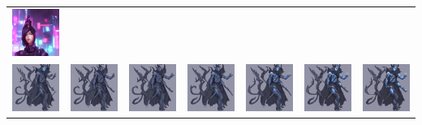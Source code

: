 \begin{table}[!htb]
\begin{tabular}{c c@{}c@{}c@{}c@{}c@{}c}
    \includegraphics[width=0.135\linewidth]{chapter/appendix/def_imgs/cyberpunk/c_60.png} \\
    \includegraphics[width=0.135\linewidth]{chapter/appendix/def_imgs/tiefling/t_0.png} &
    \includegraphics[width=0.135\linewidth]{chapter/appendix/def_imgs/tiefling/t_10.png} &
    \includegraphics[width=0.135\linewidth]{chapter/appendix/def_imgs/tiefling/t_20.png} &
    \includegraphics[width=0.135\linewidth]{chapter/appendix/def_imgs/tiefling/t_30.png} &
    \includegraphics[width=0.135\linewidth]{chapter/appendix/def_imgs/tiefling/t_40.png} &
    \includegraphics[width=0.135\linewidth]{chapter/appendix/def_imgs/tiefling/t_50.png} &
    \includegraphics[width=0.135\linewidth]{chapter/appendix/def_imgs/tiefling/t_60.png} \\

\end{tabular}
\end{table}
